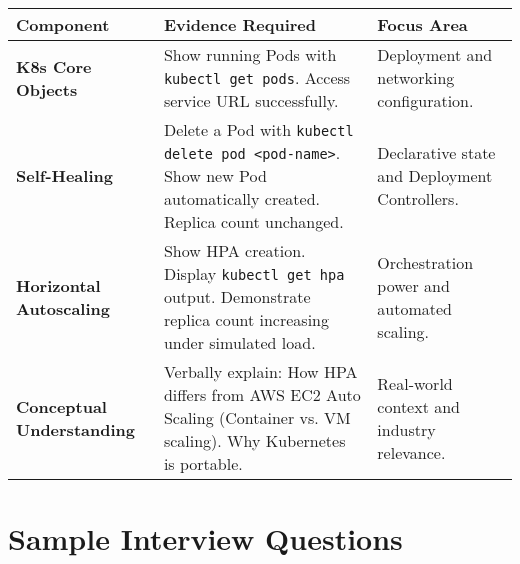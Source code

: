\documentclass[12pt,a4paper]{article}
\begin{document}
\begin{table}[H]
\centering
\small
\begin{tabularx}{\textwidth}{|l|X|X|}
\toprule
\textbf{Component} & \textbf{Evidence Required} & \textbf{Focus Area} \\
\midrule
\textbf{K8s Core Objects} &
Show running Pods with \texttt{kubectl get pods}. Access service URL successfully. &
Deployment and networking configuration. \\
\midrule
\textbf{Self-Healing} &
Delete a Pod with \texttt{kubectl delete pod <pod-name>}. Show new Pod automatically created. Replica count unchanged. &
Declarative state and Deployment Controllers. \\
\midrule
\textbf{Horizontal Autoscaling} &
Show HPA creation. Display \texttt{kubectl get hpa} output. Demonstrate replica count increasing under simulated load. &
Orchestration power and automated scaling. \\
\midrule
\textbf{Conceptual Understanding} &
Verbally explain: How HPA differs from AWS EC2 Auto Scaling (Container vs. VM scaling). Why Kubernetes is portable. &
Real-world context and industry relevance. \\
\bottomrule
\end{tabularx}
\end{table}

\section{Sample Interview Questions}
\end{document}
